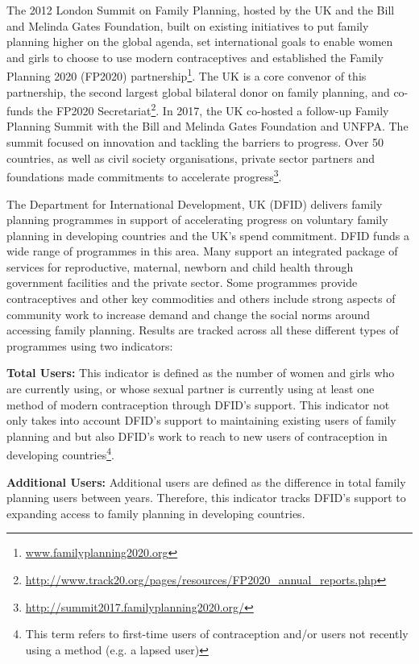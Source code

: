 The 2012 London Summit on Family Planning, hosted by the UK and the Bill and Melinda Gates Foundation, built on existing initiatives to put family planning higher on the global agenda, set international goals to enable women and girls to choose to use modern contraceptives and established the Family Planning 2020 (FP2020) partnership\footnote{\href{www.familyplanning2020.org}{www.familyplanning2020.org}}. %
The UK is a core convenor of this partnership, the second largest global bilateral donor on family planning, and co-funds the FP2020 Secretariat\footnote{\href{http://www.track20.org/pages/resources/FP2020_annual_reports.php}{http://www.track20.org/pages/resources/FP2020\_annual\_reports.php}}. %
In 2017, the UK co-hosted a follow-up Family Planning Summit with the Bill and Melinda Gates Foundation and UNFPA. %
The summit focused on innovation and tackling the barriers to progress. %
Over 50 countries, as well as civil society organisations, private sector partners and foundations made commitments to accelerate progress\footnote{\href{http://summit2017.familyplanning2020.org/}{http://summit2017.familyplanning2020.org/}}. %

The Department for International Development, UK (DFID) delivers family planning programmes in support of accelerating progress on voluntary family planning in developing countries and the UK's spend commitment. %
DFID funds a wide range of programmes in this area. %
Many support an integrated package of services for reproductive, maternal, newborn and child health through government facilities and the private sector. %
Some programmes provide contraceptives and other key commodities and others include strong aspects of community work to increase demand and change the social norms around accessing family planning. %
Results are tracked across all these different types of programmes using two indicators:
\begin{adjustwidth}{0.5cm}{}
\textbf{Total Users:} This indicator is defined as the number of women and girls who are currently using, or whose sexual partner is currently using at least one method of modern contraception through DFID's support. %
This indicator not only takes into account DFID's support to maintaining existing users of family planning and but also DFID's work to reach to new users of contraception in developing countries\footnote{This term refers to first-time users of contraception and/or users not recently using a method (e.g. a lapsed user)}. %

\medskip

\noindent\textbf{Additional Users:} Additional users are defined as the difference in total family planning users between years. Therefore, this indicator tracks DFID's support to expanding access to family planning in developing countries.%
\end{adjustwidth}


\newpage
